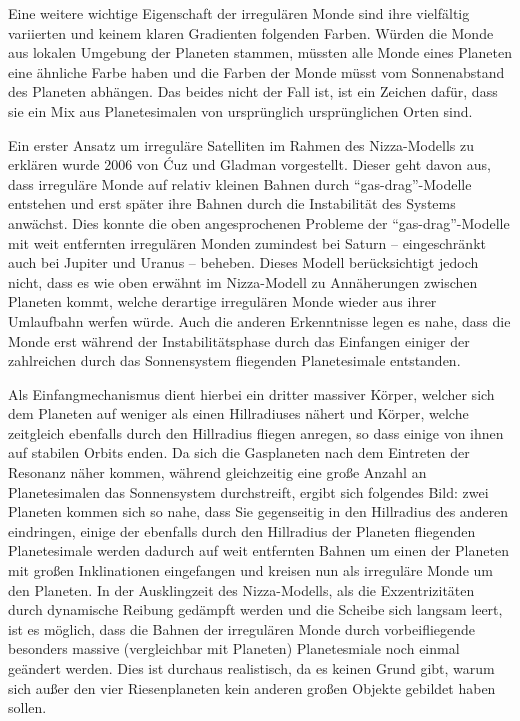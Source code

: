 \documentclass[10pt,a4paper,twoside]{article}
\begin{document}
Eine weitere wichtige Eigenschaft der irregulären Monde sind ihre vielfältig variierten und keinem klaren Gradienten folgenden Farben. Würden die Monde aus lokalen Umgebung der Planeten stammen, müssten alle Monde eines Planeten eine ähnliche Farbe haben und die Farben der Monde müsst vom Sonnenabstand des Planeten abhängen\cite{Nesvorny2007}. Das beides nicht der Fall ist, ist ein Zeichen dafür, dass sie ein Mix aus Planetesimalen von ursprünglich ursprünglichen Orten sind. %

Ein erster Ansatz um irreguläre Satelliten im Rahmen des Nizza-Modells zu erklären wurde 2006 von Ćuz und Gladman vorgestellt\cite{Cuk2006}. Dieser geht davon aus, dass irreguläre Monde auf relativ kleinen Bahnen durch "`gas-drag"'-Modelle entstehen und erst später ihre Bahnen durch die Instabilität des Systems anwächst. Dies konnte die oben angesprochenen Probleme der "`gas-drag"'-Modelle mit weit entfernten irregulären Monden zumindest bei Saturn – eingeschränkt auch bei Jupiter und Uranus – beheben\cite{Cuk2006}. %
Dieses Modell berücksichtigt jedoch nicht, dass es wie oben erwähnt im Nizza-Modell zu Annäherungen zwischen Planeten kommt, welche derartige irregulären Monde wieder aus ihrer Umlaufbahn werfen würde. Auch die anderen Erkenntnisse legen es nahe, dass die Monde erst während der Instabilitätsphase durch das Einfangen einiger der zahlreichen durch das Sonnensystem fliegenden Planetesimale entstanden. %

Als Einfangmechanismus dient hierbei ein dritter massiver Körper,
welcher sich dem Planeten auf weniger als einen Hillradiuses nähert und Körper, %
welche zeitgleich ebenfalls durch den Hillradius fliegen anregen, so dass einige von ihnen auf stabilen Orbits enden. %
Da sich die Gasplaneten nach dem Eintreten der Resonanz näher kommen, während gleichzeitig eine große Anzahl an Planetesimalen das Sonnensystem durchstreift,
ergibt sich folgendes Bild: zwei Planeten kommen sich so nahe, dass Sie gegenseitig in den Hillradius des anderen eindringen,
einige der ebenfalls durch den Hillradius der Planeten fliegenden Planetesimale werden dadurch auf weit entfernten Bahnen um einen der Planeten mit großen Inklinationen eingefangen und %
kreisen nun als irreguläre Monde um den Planeten\cite{Nesvorny2007}.
In der Ausklingzeit des Nizza-Modells, als die Exzentrizitäten durch dynamische Reibung gedämpft werden und die Scheibe sich langsam leert, ist es möglich, dass die Bahnen der irregulären Monde durch vorbeifliegende besonders massive (vergleichbar mit Planeten) Planetesmiale noch einmal geändert werden. %
Dies ist durchaus realistisch, da es keinen Grund gibt, warum sich außer den vier Riesenplaneten kein anderen großen Objekte gebildet haben sollen\cite{Nesvorny2007}. %
%
\end{document}
